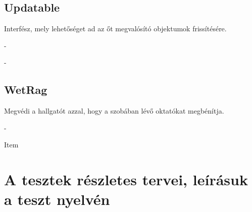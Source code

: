\subsection{Updatable}
\begin{class-template-responsibility}
    Interfész, mely lehetőséget ad az őt megvalósító objektumok frissítésére.
\end{class-template-responsibility}
\begin{class-template-interface} -
\end{class-template-interface}
\begin{class-template-baseclass} -
\end{class-template-baseclass}
\begin{class-template-method}
\end{class-template-method}

\subsection{WetRag}
\begin{class-template-responsibility}
    Megvédi a hallgatót azzal, hogy a szobában lévő oktatókat megbénítja.
\end{class-template-responsibility}
\begin{class-template-interface}
    -
\end{class-template-interface}
\begin{class-template-baseclass}
    Item
\end{class-template-baseclass}
\begin{class-template-attribute}
\end{class-template-attribute}
\begin{class-template-method}
\end{class-template-method}

\section{A tesztek részletes tervei, leírásuk a teszt nyelvén}
